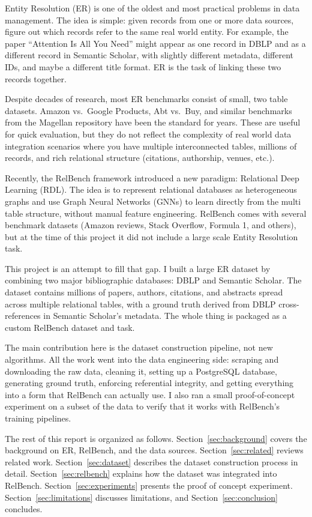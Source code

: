 \documentclass{article}
\begin{document}
Entity Resolution (ER) is one of the oldest and most practical problems in data management.
The idea is simple: given records from one or more data sources, figure out which records refer to the same real world entity.
For example, the paper ``Attention Is All You Need'' might appear as one record in DBLP and as a different record in Semantic Scholar, with slightly different metadata, different IDs, and maybe a different title format.
ER is the task of linking these two records together.

Despite decades of research, most ER benchmarks consist of small, two table datasets.
Amazon vs.\ Google Products, Abt vs.\ Buy, and similar benchmarks from the Magellan repository have been the standard for years.
These are useful for quick evaluation, but they do not reflect the complexity of real world data integration scenarios where you have multiple interconnected tables, millions of records, and rich relational structure (citations, authorship, venues, etc.).

Recently, the RelBench framework \citep{robinson2024relbench} introduced a new paradigm: Relational Deep Learning (RDL).
The idea is to represent relational databases as heterogeneous graphs and use Graph Neural Networks (GNNs) to learn directly from the multi table structure, without manual feature engineering.
RelBench comes with several benchmark datasets (Amazon reviews, Stack Overflow, Formula 1, and others), but at the time of this project it did not include a large scale Entity Resolution task.

This project is an attempt to fill that gap.
I built a large ER dataset by combining two major bibliographic databases: DBLP and Semantic Scholar.
The dataset contains millions of papers, authors, citations, and abstracts spread across multiple relational tables, with a ground truth derived from DBLP cross-references in Semantic Scholar's metadata.
The whole thing is packaged as a custom RelBench dataset and task.

The main contribution here is the dataset construction pipeline, not new algorithms.
All the work went into the data engineering side: scraping and downloading the raw data, cleaning it, setting up a PostgreSQL database, generating ground truth, enforcing referential integrity, and getting everything into a form that RelBench can actually use.
I also ran a small proof-of-concept experiment on a subset of the data to verify that it works with RelBench's training pipelines.

The rest of this report is organized as follows.
Section~\ref{sec:background} covers the background on ER, RelBench, and the data sources.
Section~\ref{sec:related} reviews related work.
Section~\ref{sec:dataset} describes the dataset construction process in detail.
Section~\ref{sec:relbench} explains how the dataset was integrated into RelBench.
Section~\ref{sec:experiments} presents the proof of concept experiment.
Section~\ref{sec:limitations} discusses limitations, and Section~\ref{sec:conclusion} concludes.
\end{document}
